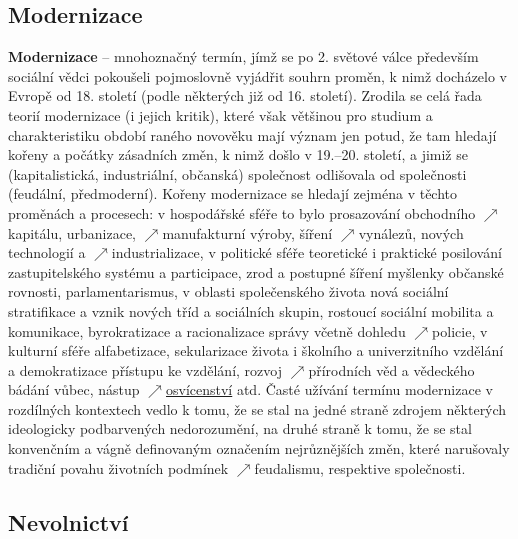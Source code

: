 \documentclass{article}
\begin{document}
  \subsection*{Modernizace~\cite{Hroch:}}
  \label{sec:modernizace}

  {\bf Modernizace} -- mnohoznačný termín, jímž se po 2. světové válce především sociální vědci pokoušeli pojmoslovně vyjádřit souhrn proměn, k nimž docházelo v Evropě od 18. století (podle některých již od 16. století). Zrodila se celá řada teorií modernizace (i jejich kritik), které však většinou pro studium a charakteristiku období raného novověku mají význam jen potud, že tam hledají kořeny a počátky zásadních změn, k nimž došlo v 19.--20. století, a jimiž se  (kapitalistická, industriální, občanská) společnost odlišovala od společnosti  (feudální, předmoderní). Kořeny modernizace se hledají zejména v těchto proměnách a procesech: v hospodářské sféře to bylo prosazování obchodního $\nearrow$kapitálu, urbanizace, $\nearrow$manufakturní výroby, šíření $\nearrow$vynálezů, nových technologií a $\nearrow$industrializace, v politické sféře teoretické i praktické posilování zastupitelského systému a participace, zrod a postupné šíření myšlenky občanské rovnosti, parlamentarismus, v oblasti společenského života nová sociální stratifikace a vznik nových tříd a sociálních skupin, rostoucí sociální mobilita a komunikace, byrokratizace a racionalizace správy včetně dohledu $\nearrow$policie, v kulturní sféře alfabetizace, sekularizace života i školního a univerzitního vzdělání a demokratizace přístupu ke vzdělání, rozvoj $\nearrow$přírodních věd a vědeckého bádání vůbec, nástup $\nearrow$\hyperref[sec:osvicenstvi]{osvícenství} atd. Časté užívání termínu modernizace v rozdílných kontextech vedlo k tomu, že se stal na jedné straně zdrojem některých ideologicky podbarvených nedorozumění, na druhé straně k tomu, že se stal konvenčním a vágně definovaným označením nejrůznějších změn, které narušovaly tradiční povahu životních podmínek $\nearrow$feudalismu, respektive  společnosti.

  \subsection*{Nevolnictví~\cite{Hroch:}}
  \label{sec:nevolnictvi}
\end{document}
